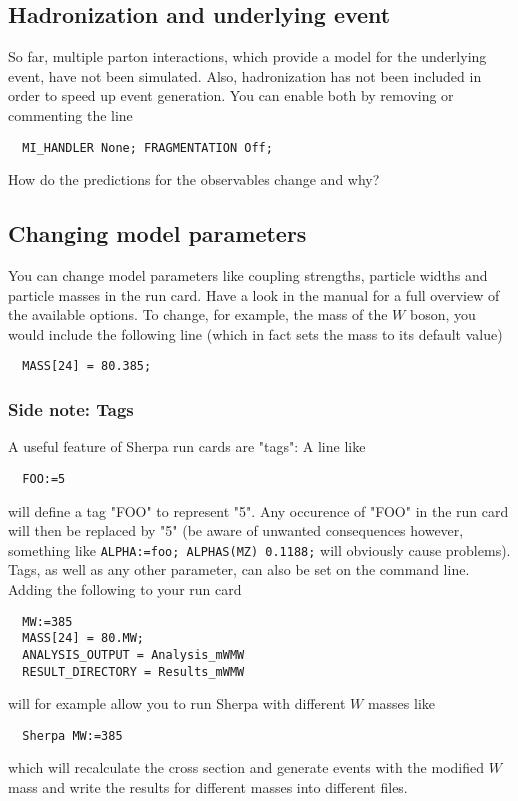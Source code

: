 \documentclass[10pt]{article}
\begin{document}
\subsection{Hadronization and underlying event}

So far, multiple parton interactions, which provide a model for the underlying event,
have not been simulated. Also, hadronization has not been included in order to speed up
event generation. You can enable both by removing or commenting the line
\begin{verbatim}
  MI_HANDLER None; FRAGMENTATION Off;
\end{verbatim}
How do the predictions for the observables change and why?

\subsection{Changing model parameters}

You can change model parameters like coupling strengths, particle widths and
particle masses in the run card. Have a look in the manual for a full overview
of the available options. To change, for example, the mass of the $W$ boson, you
would include the following line (which in fact sets the mass to its default
value)
\begin{verbatim}
  MASS[24] = 80.385;
\end{verbatim}

\subsubsection{Side note: Tags}

A useful feature of Sherpa run cards are "tags": A line like
\begin{verbatim}
  FOO:=5
\end{verbatim}
will define a tag "FOO" to represent "5". Any occurence of "FOO" in the run card
will then be replaced by "5" (be aware of unwanted consequences however,
something like {\tt ALPHA:=foo; ALPHAS(MZ) 0.1188;} will obviously cause
problems). Tags, as well as any other parameter, can also be set on the command
line. Adding the following to your run card
\begin{verbatim}
  MW:=385
  MASS[24] = 80.MW;
  ANALYSIS_OUTPUT = Analysis_mWMW
  RESULT_DIRECTORY = Results_mWMW
\end{verbatim}
will for example allow you to run Sherpa with different $W$ masses like
\begin{verbatim}
  Sherpa MW:=385
\end{verbatim}
which will recalculate the cross section and generate events with the modified
$W$ mass and write the results for different masses into different files.
\end{document}

